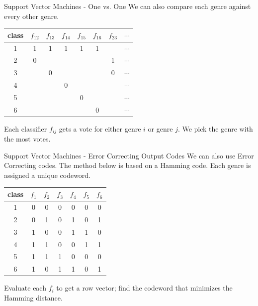 \documentclass[xcolor=dvipsnames,t]{beamer} %
\begin{document}
\begin{frame}{Support Vector Machines - One vs. One}
   We can also compare each genre against every other genre.

\begin{table}
   \centering
   \begin{tabular}{|c|ccccccc|}
      \hline
      class&$f_{12}$ & $f_{13}$ & $f_{14}$ & $f_{15}$ & $f_{16}$ & $f_{23}$ & $\cdots$ \\\hline
      1 & 1 & 1 & 1 & 1 & 1 &   & $\cdots$ \\\hline
      2 & 0 &   &   &   &   & 1 & $\cdots$ \\\hline
      3 &   & 0 &   &   &   & 0 & $\cdots$ \\\hline
      4 &   &   & 0 &   &   &   & $\cdots$ \\\hline
      5 &   &   &   & 0 &   &   & $\cdots$ \\\hline
      6 &   &   &   &   & 0 &   & $\cdots$ \\\hline
   \end{tabular}
\end{table}
   
   Each classifier $f_{ij}$ gets a vote for either genre $i$ or genre $j$.  We pick the genre with the most votes.

\end{frame}

\begin{frame}{Support Vector Machines - Error Correcting Output Codes}
   We can also use Error Correcting codes.  The method below is based on a Hamming code.  Each genre is assigned a unique codeword.

\begin{table}
   \centering
   \begin{tabular}{|c|cccccc|}
      \hline
      class&$f_{1}$ & $f_{2}$ & $f_{3}$ & $f_{4}$ & $f_{5}$ & $f_{6}$ \\\hline
      1 & 0 & 0 & 0 & 0 & 0 & 0 \\\hline
      2 & 0 & 1 & 0 & 1 & 0 & 1 \\\hline
      3 & 1 & 0 & 0 & 1 & 1 & 0 \\\hline
      4 & 1 & 1 & 0 & 0 & 1 & 1 \\\hline
      5 & 1 & 1 & 1 & 0 & 0 & 0 \\\hline
      6 & 1 & 0 & 1 & 1 & 0 & 1 \\\hline
   \end{tabular}
\end{table}

   Evaluate each $f_i$ to get a row vector; find the codeword that minimizes the Hamming distance.\\

\end{frame}
\end{document}
